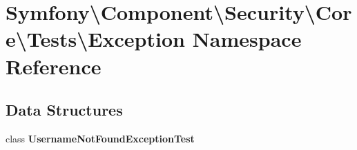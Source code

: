 \section{Symfony\textbackslash{}Component\textbackslash{}Security\textbackslash{}Core\textbackslash{}Tests\textbackslash{}Exception Namespace Reference}
\label{namespace_symfony_1_1_component_1_1_security_1_1_core_1_1_tests_1_1_exception}
\subsection*{Data Structures}
\begin{DoxyCompactItemize}
\item 
class {\bf Username\+Not\+Found\+Exception\+Test}
\end{DoxyCompactItemize}
